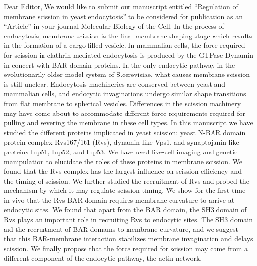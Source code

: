 \documentclass{letter}
\begin{document}
Dear Editor, 
We would like to submit our manuscript entitled “Regulation of membrane scission in yeast endocytosis” to be considered for publication as an “Article” in your journal Molecular Biology of the Cell. 
In the process of endocytosis, membrane scission is the final membrane-shaping stage which  results in the formation of a cargo-filled vesicle. In mammalian cells, the force required for scission in clathrin-mediated endocytosis is produced by the GTPase Dynamin in concert with BAR domain proteins. In the only endocytic pathway in the evolutionarily older model system of S.cerevisiae, what causes membrane scission is still unclear. Endocytosis machineries are conserved between yeast and mammalian cells, and endocytic invaginations undergo similar shape transitions from flat membrane to spherical vesicles. Differences in the scission machinery may have come about to accommodate different force requirements required for pulling and severing the membrane in these cell types. 
In this manuscript we have studied the different proteins implicated in yeast scission: yeast N-BAR domain protein complex Rvs167/161 (Rvs), dynamin-like Vps1, and synaptojanin-like proteins Inp51, Inp52, and Inp53. We have used live-cell imaging and genetic manipulation to elucidate the roles of these proteins in membrane scission. We found that the Rvs complex has the largest influence on scission efficiency and the timing of scission. We further studied the recruitment of Rvs and probed the mechanism by which it may regulate scission timing. We show for the first time in vivo that the Rvs BAR domain requires membrane curvature to arrive at endocytic sites. We found that apart from the BAR domain, the SH3 domain of Rvs plays an important role in recruiting Rvs to endocytic sites. The SH3 domain aid the recruitment of BAR domains to membrane curvature, and we suggest that this BAR-membrane interaction stabilizes membrane invagination and delays scission. We finally propose that the force required for scission may come from a different component of the endocytic pathway, the actin network. 
\end{document}
